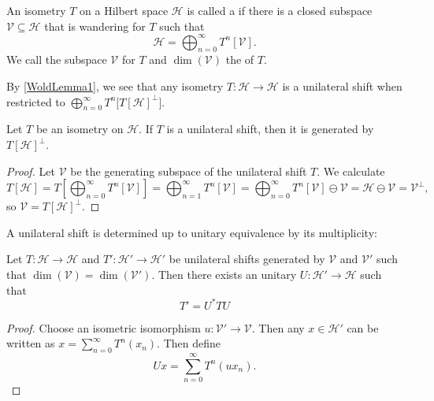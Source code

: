 \begin{definition}
An isometry $T$ on a Hilbert space $\mathcal{H}$ is called a  if there is a closed subspace $\mathcal{V}\subseteq \mathcal{H}$ that is wandering for $T$ such that
\[ \mathcal{H} = \bigoplus_{n=0}^\infty T^n[\mathcal{V}]. \]
We call the subspace $\mathcal{V}$  for $T$ and $\dim(\mathcal{V})$ the  of $T$.
\end{definition}

By \ref{WoldLemma1}, we see that any isometry $T:\mathcal{H}\to\mathcal{H}$ is a unilateral shift when restricted to $\bigoplus_{n=0}^\infty T^n\big[T[\mathcal{H}]^\perp\big]$.



\begin{lemma} \label{WoldLemma2}
Let $T$ be an isometry on $\mathcal{H}$. If $T$ is a unilateral shift, then it is generated by $T[\mathcal{H}]^\perp$.
\end{lemma}
\begin{proof}
Let $\mathcal{V}$ be the generating subspace of the unilateral shift $T$. We calculate
\[ T[\mathcal{H}] = T\left[\bigoplus_{n=0}^\infty T^n[\mathcal{V}]\right] = \bigoplus_{n=1}^\infty T^n[\mathcal{V}] = \bigoplus_{n=0}^\infty T^n[\mathcal{V}] \ominus \mathcal{V} = \mathcal{H}\ominus \mathcal{V} = \mathcal{V}^\perp, \]
so $\mathcal{V} = T[\mathcal{H}]^\perp$.
\end{proof}

A unilateral shift is determined up to unitary equivalence by its multiplicity:
\begin{lemma}
Let $T: \mathcal{H}\to\mathcal{H}$ and $T':\mathcal{H}'\to\mathcal{H}'$ be unilateral shifts generated by $\mathcal{V}$ and $\mathcal{V}'$ such that $\dim(\mathcal{V}) = \dim(\mathcal{V}')$. Then there exists an unitary $U:\mathcal{H}'\to\mathcal{H}$ such that
\[ T' = U^*TU \]
\end{lemma}
\begin{proof}
Choose an isometric isomorphism $u:\mathcal{V}'\to\mathcal{V}$. Then any $x\in\mathcal{H}'$ can be written as $x = \sum_{n=0}^\infty T^n(x_n)$. Then define
\[ Ux = \sum_{n=0}^\infty T^n(ux_n). \]
\end{proof}

